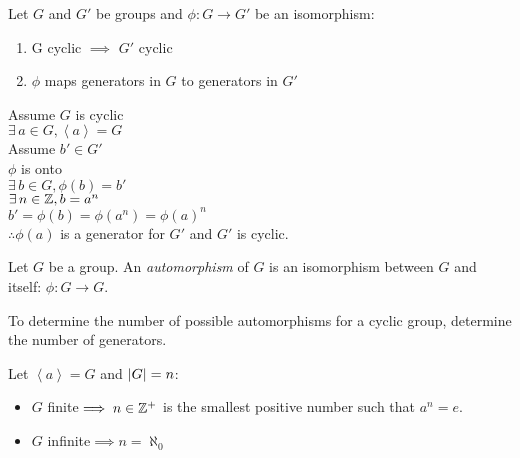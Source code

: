 \documentclass[letterpaper,12pt,fleqn]{article}
\newcommand{\cycle}[1]{\left<#1\right>}
\newcommand{\p}{\phi}
\begin{document}
\begin{theorem}
  Let $G$ and $G'$ be groups and $\p:G\to G'$ be an isomorphism:
  \begin{enumerate}
  \item{G cyclic $\implies$ $G'$ cyclic}
  \item{$\p$ maps generators in $G$ to generators in $G'$}
  \end{enumerate}
\end{theorem}

\begin{theproof}
  Assume $G$ is cyclic \\
  $\exists\,a\in G,\cycle{a}=G$ \\
  Assume $b'\in G'$ \\
  $\p$ is onto \\
  $\exists\,b\in G,\p(b)=b'$ \\
  $\exists\,n\in\mathbb{Z},b=a^n$ \\
  $b'=\p(b)=\p(a^n)=\p(a)^n$ \\
  $\therefore \p(a)$ is a generator for $G'$ and $G'$ is cyclic.
\end{theproof}

\begin{definition}
  Let $G$ be a group. An \emph{automorphism} of $G$ is an isomorphism between
  $G$ and itself: $\p:G\to G$.
\end{definition}

To determine the number of possible automorphisms for a cyclic group,
determine the number of generators.

\begin{theorem}
  Let $\cycle{a}=G$ and $\lvert G\rvert=n$:
  \begin{itemize}
  \item $G$ finite$\implies n\in\mathbb{Z}^+$ is the smallest positive number such
    that $a^n=e$.
  \item $G$ infinite$\implies n=\aleph_0$
  \end{itemize}
\end{theorem}
\end{document}
